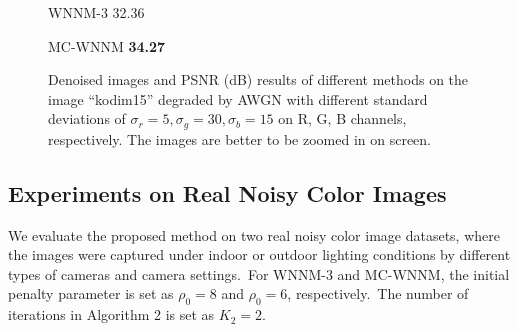 \begin{figure}
{\begin{minipage}[t]{0.19\textwidth}
{\footnotesize WNNM-3 32.36}
\end{minipage}
\begin{minipage}[t]{0.19\textwidth}
\centering
{}
{\footnotesize MC-WNNM \textbf{34.27}}
\end{minipage}
}
    \caption{Denoised images and PSNR (dB) results of different methods on the image ``kodim15'' degraded by AWGN with different standard deviations of $\sigma_{r}=5, \sigma_{g}=30, \sigma_{b}=15$ on R, G, B channels, respectively. The images are better to be zoomed in on screen.}
    \label{fig4-7}
\end{figure}


\subsection{Experiments on Real Noisy Color Images}

We evaluate the proposed method on two real noisy color image datasets, where the images were captured under indoor or outdoor lighting conditions by different types of cameras and camera settings.\ For WNNM-3 and MC-WNNM, the initial penalty parameter is set as $\rho_{0}=8$ and $\rho_{0}=6$, respectively.\ The number of iterations in Algorithm 2 is set as $K_{2}=2$.

